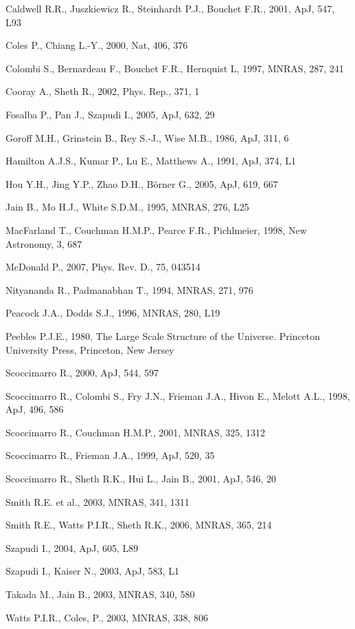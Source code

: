 \documentclass[]{mn2e}
\begin{document}
\begin{thebibliography}{}
\item[] Caldwell R.R., Juszkiewicz R., Steinhardt P.J., Bouchet F.R.,
2001, ApJ, 547, L93
\item[] Coles P., Chiang L.-Y., 2000, Nat, 406, 376
\item[] Colombi S., Bernardeau F., Bouchet F.R., Hernquist L, 1997,
MNRAS, 287, 241
\item[] Cooray A., Sheth R., 2002, Phys. Rep., 371, 1
\item[] Fosalba P., Pan J., Szapudi I., 2005, ApJ, 632, 29
\item[] Goroff M.H., Grinstein B., Rey S.-J., Wise M.B., 1986, ApJ,
311, 6
\item[] Hamilton A.J.S., Kumar P., Lu E., Matthews A., 1991, ApJ,
374, L1
\item[] Hou Y.H., Jing Y.P., Zhao D.H., B\"{o}rner G., 2005, ApJ,
619, 667
\item[] Jain B., Mo H.J., White S.D.M., 1995, MNRAS, 276, L25
\item[] MacFarland T., Couchman H.M.P., Pearce F.R., Pichlmeier,
1998, New Astronomy, 3, 687
\item[] McDonald P., 2007, Phys. Rev. D., 75, 043514
\item[] Nityananda R., Padmanabhan T., 1994, MNRAS, 271, 976
\item[] Peacock J.A., Dodds S.J., 1996, MNRAS, 280, L19
\item[] Peebles P.J.E., 1980, The Large Scale Structure of the
Universe. Princeton University Press, Princeton, New Jersey
\item[] Scoccimarro R., 2000, ApJ, 544, 597
\item[] Scoccimarro R., Colombi S., Fry J.N., Frieman J.A., Hivon
E., Melott A.L., 1998, ApJ, 496, 586
\item[] Scoccimarro R., Couchman H.M.P., 2001, MNRAS, 325, 1312
\item[] Scoccimarro R., Frieman J.A., 1999, ApJ, 520, 35
\item[] Scoccimarro R., Sheth R.K., Hui L., Jain B., 2001, ApJ, 546,
20
\item[] Smith R.E. et al., 2003, MNRAS, 341, 1311
\item[] Smith R.E., Watts P.I.R., Sheth R.K., 2006, MNRAS, 365, 214
\item[] Szapudi I., 2004, ApJ, 605, L89
\item[] Szapudi I., Kaiser N., 2003, ApJ, 583, L1
\item[] Takada M., Jain B., 2003, MNRAS, 340, 580
\item[] Watts P.I.R., Coles, P., 2003, MNRAS, 338, 806
\end{thebibliography}
\end{document}
